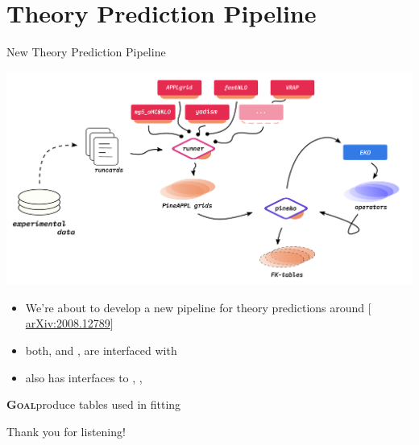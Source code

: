 \documentclass[9pt]{beamer}
\providecommand{\iRef}[1]{{\color{mLightGreen}\small $[$#1$]$}}
\begin{document}
\section{Theory Prediction Pipeline}

\begin{frame}{New Theory Prediction Pipeline}
	\begin{center}
		\includegraphics[width=.8\linewidth]{fk}
	\end{center}

	\begin{itemize}
        \item We're about to develop a new pipeline for theory predictions
            around \pineappl{}
            \iRef{\href{https://arxiv.org/abs/2008.12789}{arXiv:2008.12789}}
		\item both, \eko and \yadism, are interfaced with \pineappl
        \item \pineappl also has interfaces to \madgraph, \appl, \fastnlo
	\end{itemize}

    \vspace*{10pt}
    \textbf{\textsc{Goal}}\quad produce \fk tables used in \pdf fitting
\end{frame}

\begin{frame}[standout]
    Thank you for listening!
\end{frame}
\end{document}
